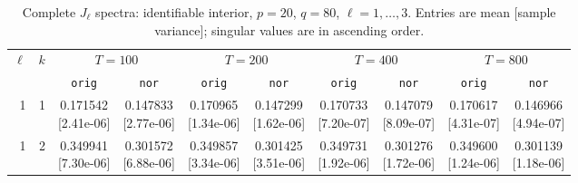 \documentclass[12pt,letterpaper]{article}
\def\spacingset#1{\renewcommand{\baselinestretch}{#1}\small\normalsize}
\theoremstyle{plain}
\theoremstyle{definition}
\begin{document}
\begin{table}[p]
\begingroup
\spacingset{1.0}
\small\centering
\caption{Complete $J_\ell$ spectra: identifiable interior, $p=20$, $q=80$, $\ell=1,\ldots,3$. Entries are mean [sample variance]; singular values are in ascending order.}
\label{s23:lambda:alltab:spectra:p20q80interior:1-3}
\footnotesize
\setlength{\tabcolsep}{2.2pt}
\renewcommand{\arraystretch}{1.03}
\begin{adjustbox}{max width=\linewidth}
\begin{tabular}{@{}rr*{8}{c}@{}}
\toprule
$\ell$ & $k$ & \multicolumn{2}{c}{$T=100$} & \multicolumn{2}{c}{$T=200$} & \multicolumn{2}{c}{$T=400$} & \multicolumn{2}{c}{$T=800$}\\
\cmidrule(lr){3-4}\cmidrule(lr){5-6}\cmidrule(lr){7-8}\cmidrule(lr){9-10}
 &  & \texttt{orig} & \texttt{nor} & \texttt{orig} & \texttt{nor} & \texttt{orig} & \texttt{nor} & \texttt{orig} & \texttt{nor}\\
\midrule
1 & 1 & \shortstack{0.171542\\[-1pt]{\scriptsize[2.41e-06]}} & \shortstack{0.147833\\[-1pt]{\scriptsize[2.77e-06]}} & \shortstack{0.170965\\[-1pt]{\scriptsize[1.34e-06]}} & \shortstack{0.147299\\[-1pt]{\scriptsize[1.62e-06]}} & \shortstack{0.170733\\[-1pt]{\scriptsize[7.20e-07]}} & \shortstack{0.147079\\[-1pt]{\scriptsize[8.09e-07]}} & \shortstack{0.170617\\[-1pt]{\scriptsize[4.31e-07]}} & \shortstack{0.146966\\[-1pt]{\scriptsize[4.94e-07]}}\\
1 & 2 & \shortstack{0.349941\\[-1pt]{\scriptsize[7.30e-06]}} & \shortstack{0.301572\\[-1pt]{\scriptsize[6.88e-06]}} & \shortstack{0.349857\\[-1pt]{\scriptsize[3.34e-06]}} & \shortstack{0.301425\\[-1pt]{\scriptsize[3.51e-06]}} & \shortstack{0.349731\\[-1pt]{\scriptsize[1.92e-06]}} & \shortstack{0.301276\\[-1pt]{\scriptsize[1.72e-06]}} & \shortstack{0.349600\\[-1pt]{\scriptsize[1.24e-06]}} & \shortstack{0.301139\\[-1pt]{\scriptsize[1.18e-06]}}\\

\end{tabular}
\end{adjustbox}
\end{table}
\end{document}
